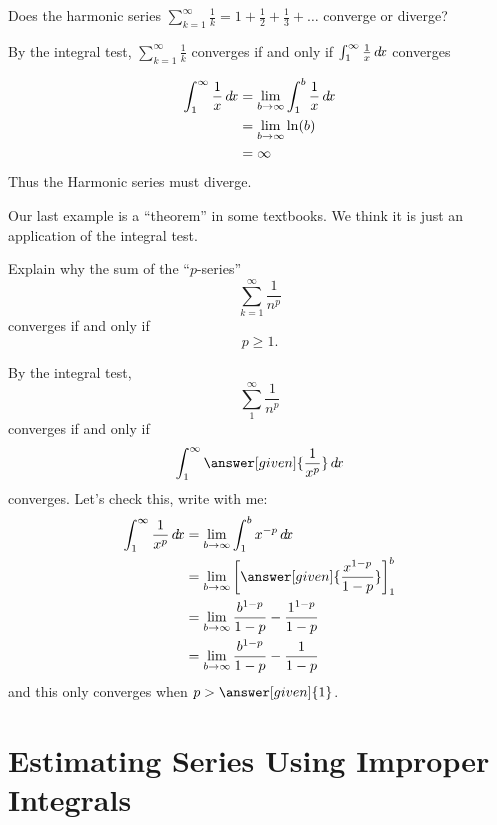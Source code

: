 \documentclass{ximera}
\begin{document}
\begin{question}
  Does the harmonic series $\sum_{k=1}^\infty \frac{1}{k} = 1 + \frac{1}{2} + \frac{1}{3}+ \dots$ converge or diverge?
  \begin{multipleChoice}
  \end{multipleChoice}
  \begin{hint}
    By the integral test, $\sum_{k=1}^\infty \frac{1}{k}$ converges if
    and only if $\int_1^\infty \frac{1}{x} \mathop{}\!d\! x$ converges
  \end{hint}
  \begin{hint}
    \begin{align*}
      \int_1^\infty \frac{1}{x} \mathop{}\!d\! x &= \lim_{b \to \infty} \int_1^b \frac{1}{x} \mathop{}\!d\! x\\
      &=\lim_{b \to \infty} \ln(b) \\
      &=\infty
    \end{align*}
    Thus the Harmonic series must diverge.
  \end{hint}
\end{question}

Our last example is a ``theorem'' in some textbooks. We think it is
just an application of the integral test.

\begin{example}[$p$-test]
  Explain why the sum of the ``$p$-series''
  \[
  \sum_{k=1}^\infty \frac{1}{n^p}
  \]
  converges if and only if
  \[
  p \geq 1.
  \]
  \begin{explanation}
    By the integral test,
    \[
    \sum_1^\infty \frac{1}{n^p}
    \]
    converges if and only if
    \[
    \int_1^\infty \answer[given]{\frac{1}{x^p}} \d x
    \]
    converges. Let's check this, write with me:
    \begin{align*}
      \int_1^\infty \frac{1}{x^p} \d x &= \lim_{b\to\infty} \int_1^b x^{-p} \d x\\
      &= \lim_{b\to\infty} \eval{\answer[given]{\frac{x^{1-p}}{1-p}}}_1^b\\
      &= \lim_{b\to\infty} \frac{b^{1-p}}{1-p} - \frac{1^{1-p}}{1-p}\\
      &= \lim_{b\to\infty} \frac{b^{1-p}}{1-p} - \frac{1}{1-p}
    \end{align*}
    and this only converges when $p>\answer[given]{1}$.
  \end{explanation}
\end{example}


\section{Estimating Series Using Improper Integrals}
\end{document}
